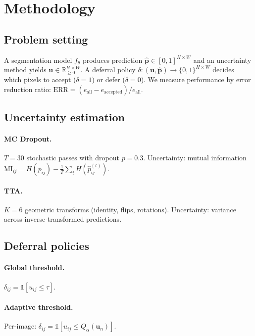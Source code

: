 \documentclass[smallextended]{svjour3}
\begin{document}
\section{Methodology}

\subsection{Problem setting}

A segmentation model $f_\theta$ produces prediction $\hat{\mathbf{p}} \in
[0,1]^{H \times W}$ and an uncertainty method yields $\mathbf{u} \in
\mathbb{R}_{\geq 0}^{H \times W}$. A deferral policy $\delta: (\mathbf{u},
\hat{\mathbf{p}}) \to \{0,1\}^{H \times W}$ decides which pixels to accept
($\delta = 1$) or defer ($\delta = 0$). We measure performance by error
reduction ratio: $\text{ERR} = (e_{\text{all}} - e_{\text{accepted}}) /
e_{\text{all}}$.

\subsection{Uncertainty estimation}

\paragraph{MC Dropout.} $T = 30$ stochastic passes with dropout $p = 0.3$.
Uncertainty: mutual information $\text{MI}_{ij} = H(\bar{p}_{ij}) -
\frac{1}{T}\sum_t H(\hat{p}^{(t)}_{ij})$.

\paragraph{TTA.} $K = 6$ geometric transforms (identity, flips, rotations).
Uncertainty: variance across inverse-transformed predictions.

\subsection{Deferral policies}

\paragraph{Global threshold.} $\delta_{ij} = \mathbb{1}[u_{ij} \leq \tau]$.
\paragraph{Adaptive threshold.} Per-image: $\delta_{ij} = \mathbb{1}[u_{ij}
\leq Q_\alpha(\mathbf{u}_n)]$.
\end{document}
